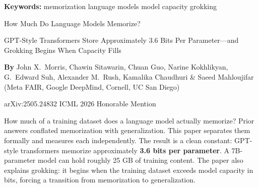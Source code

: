 \documentclass[10pt,twocolumn]{article}
\begin{document}
\setlength{\parindent}{0pt}
\setlength{\parskip}{4pt}

{\small\color{keywordgray}\textbf{Keywords:}
  memorization \textbullet{}
  language models \textbullet{}
  model capacity \textbullet{}
  grokking}\par\vspace{4pt}

{\LARGE\bfseries\raggedright
  How Much Do Language Models Memorize?}\par\vspace{4pt}

{\large\itshape\raggedright
  GPT-Style Transformers Store Approximately 3.6 Bits Per
  Parameter---and Grokking Begins When Capacity Fills}\par\vspace{6pt}

{\small\textbf{By} John X.\ Morris, Chawin Sitawarin, Chuan Guo,
  Narine Kokhlikyan, G.\ Edward Suh, Alexander M.\ Rush,
  Kamalika Chaudhuri \& Saeed Mahloujifar
  (Meta FAIR, Google DeepMind, Cornell, UC San Diego)}\par\vspace{2pt}

{\small\color{keywordgray}arXiv:2505.24832 \textbullet{}
  ICML 2026 Honorable Mention}
\par\vspace{2pt}\noindent{\color{rulered}\rule{\columnwidth}{0.6pt}}\vspace{6pt}

How much of a training dataset does a language model actually memorize?
Prior answers conflated memorization with generalization. This paper separates
them formally and measures each independently. The result is a clean constant:
GPT-style transformers memorize approximately \textbf{3.6 bits per parameter}.
A 7B-parameter model can hold roughly 25 GB of training content. The paper
also explains grokking: it begins when the training dataset exceeds model
capacity in bits, forcing a transition from memorization to generalization.
\end{document}
